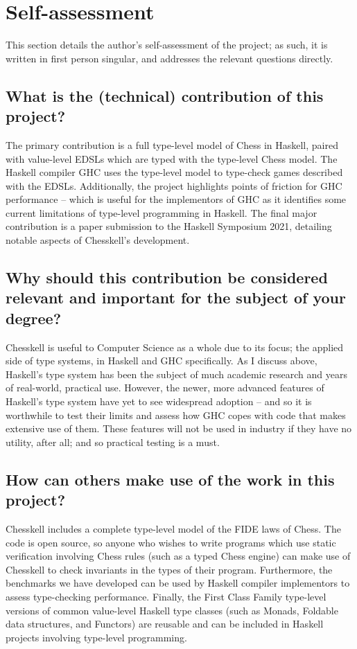 \section{Self-assessment}

This section details the author's self-assessment of the project; as such, it is written in first person singular, and addresses the relevant questions directly.

\subsection{What is the (technical) contribution of this project?}

The primary contribution is a full type-level model of Chess in Haskell, paired with value-level EDSLs which are typed with the type-level Chess model. The Haskell compiler GHC uses the type-level model to type-check games described with the EDSLs. Additionally, the project highlights points of friction for GHC performance -- which is useful for the implementors of GHC as it identifies some current limitations of type-level programming in Haskell. The final major contribution is a paper submission to the Haskell Symposium 2021, detailing notable aspects of Chesskell's development.

\subsection{Why should this contribution be considered relevant and important for the subject of your degree?}

Chesskell is useful to Computer Science as a whole due to its focus; the applied side of type systems, in Haskell and GHC specifically. As I discuss above, Haskell's type system has been the subject of much academic research and years of real-world, practical use. However, the newer, more advanced features of Haskell's type system have yet to see widespread adoption -- and so it is worthwhile to test their limits and assess how GHC copes with code that makes extensive use of them. These features will not be used in industry if they have no utility, after all; and so practical testing is a must.

\subsection{How can others make use of the work in this project?}

Chesskell includes a complete type-level model of the FIDE laws of Chess. The code is open source, so anyone who wishes to write programs which use static verification involving Chess rules (such as a typed Chess engine) can make use of Chesskell to check invariants in the types of their program. Furthermore, the benchmarks we have developed can be used by Haskell compiler implementors to assess type-checking performance. Finally, the First Class Family type-level versions of common value-level Haskell type classes (such as Monads, Foldable data structures, and Functors) are reusable and can be included in Haskell projects involving type-level programming.

